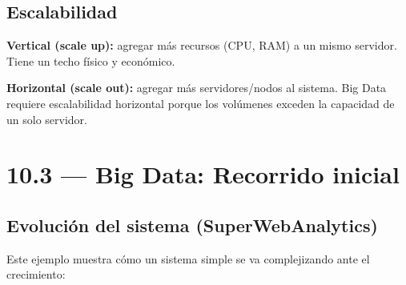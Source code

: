 \documentclass[11pt, a4paper]{article}
\begin{document}
\subsection{Escalabilidad}
\textbf{Vertical (scale up):} agregar más recursos (CPU, RAM) a un mismo servidor. Tiene un techo físico y económico.

\textbf{Horizontal (scale out):} agregar más servidores/nodos al sistema. Big Data requiere escalabilidad horizontal porque los volúmenes exceden la capacidad de un solo servidor.

\section{10.3 — Big Data: Recorrido inicial}

\subsection{Evolución del sistema (SuperWebAnalytics)}

Este ejemplo muestra cómo un sistema simple se va complejizando ante el crecimiento:
\end{document}
